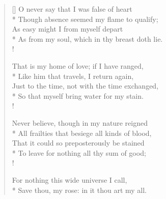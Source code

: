 \documentclass[MAIN]{subfiles}
\begin{document}
\settowidth{\versewidth}{O never say that I was false of heart}
\begin{verse}[\versewidth]
O never say that I was false of heart\\*
Though absence seemed my flame to qualify;\\
As easy might I from myself depart\\*
As from my soul, which in thy breast doth lie.\\!

That is my home of love; if I have ranged,\\*
Like him that travels, I return again,\\
Just to the time, not with the time exchanged,\\*
So that myself bring water for my stain.\\!

Never believe, though in my nature reigned\\*
All frailties that besiege all kinds of blood,\\
That it could so preposterously be stained\\*
To leave for nothing all thy sum of good;\\!

For nothing this wide universe I call,\\*
Save thou, my rose: in it thou art my all.
\end{verse}
\end{document}

